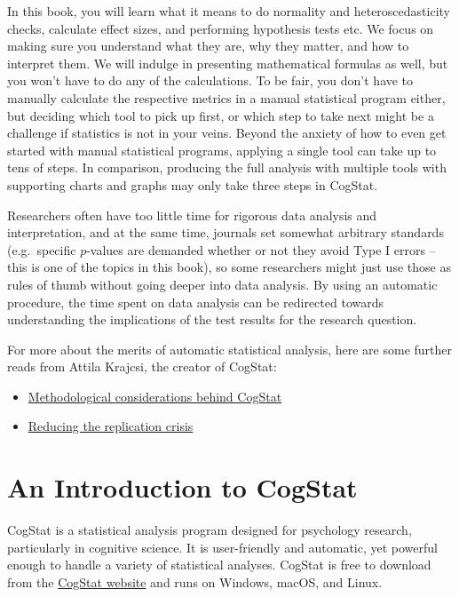 \documentclass[
]{book}
\providecommand{\tightlist}{%
  \setlength{\itemsep}{0pt}\setlength{\parskip}{0pt}}
\theoremstyle{definition}
\theoremstyle{definition}
\theoremstyle{definition}
\theoremstyle{definition}
\theoremstyle{remark}
\begin{document}
In this book, you will learn what it means to do normality and heteroscedasticity checks, calculate effect sizes, and performing hypothesis tests etc. We focus on making sure you understand what they are, why they matter, and how to interpret them. We will indulge in presenting mathematical formulas as well, but you won't have to do any of the calculations. To be fair, you don't have to manually calculate the respective metrics in a manual statistical program either, but deciding which tool to pick up first, or which step to take next might be a challenge if statistics is not in your veins. Beyond the anxiety of how to even get started with manual statistical programs, applying a single tool can take up to tens of steps. In comparison, producing the full analysis with multiple tools with supporting charts and graphs may only take three steps in CogStat.

Researchers often have too little time for rigorous data analysis and interpretation, and at the same time, journals set somewhat arbitrary standards (e.g.~specific \(p\)-values are demanded whether or not they avoid Type I errors -- this is one of the topics in this book), so some researchers might just use those as rules of thumb without going deeper into data analysis. By using an automatic procedure, the time spent on data analysis can be redirected towards understanding the implications of the test results for the research question.

For more about the merits of automatic statistical analysis, here are some further reads from Attila Krajcsi, the creator of CogStat:

\begin{itemize}
\tightlist
\item
  \href{https://psyarxiv.com/hnmsq}{Methodological considerations behind CogStat}
\item
  \href{https://docs.google.com/presentation/d/1HmSTPnTxDzW8hYZG7ujHaeHc0mRqqYeY95yKh56z61c}{Reducing the replication crisis}
\end{itemize}

\hypertarget{cogstatintro}{%
\chapter{An Introduction to CogStat}\label{cogstatintro}}

CogStat is a statistical analysis program designed for psychology research, particularly in cognitive science. It is user-friendly and automatic, yet powerful enough to handle a variety of statistical analyses. CogStat is free to download from the \href{http://cogstat.org}{CogStat website} and runs on Windows, macOS, and Linux.
\end{document}

